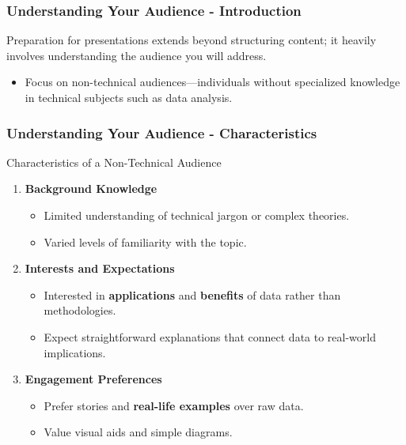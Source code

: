 \documentclass[aspectratio=169]{beamer}
\begin{document}
\begin{frame}[fragile]
    \frametitle{Understanding Your Audience - Introduction}
    Preparation for presentations extends beyond structuring content; it heavily involves understanding the audience you will address. 
    \begin{itemize}
        \item Focus on non-technical audiences—individuals without specialized knowledge in technical subjects such as data analysis.
    \end{itemize}
\end{frame}

\begin{frame}[fragile]
    \frametitle{Understanding Your Audience - Characteristics}
    \begin{block}{Characteristics of a Non-Technical Audience}
        \begin{enumerate}
            \item \textbf{Background Knowledge}
                \begin{itemize}
                    \item Limited understanding of technical jargon or complex theories.
                    \item Varied levels of familiarity with the topic.
                \end{itemize}
                
            \item \textbf{Interests and Expectations}
                \begin{itemize}
                    \item Interested in \textbf{applications} and \textbf{benefits} of data rather than methodologies.
                    \item Expect straightforward explanations that connect data to real-world implications.
                \end{itemize}
                
            \item \textbf{Engagement Preferences}
                \begin{itemize}
                    \item Prefer stories and \textbf{real-life examples} over raw data.
                    \item Value visual aids and simple diagrams.
                \end{itemize}
        \end{enumerate}
    \end{block}
\end{frame}
\end{document}
